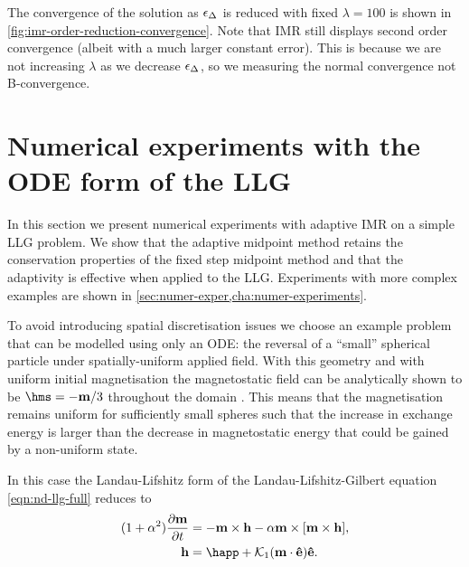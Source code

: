 The convergence of the solution as $\epsilon_{\Delta_{}}$ is reduced with fixed $\lambda = 100$ is shown in \cref{fig:imr-order-reduction-convergence}.
Note that IMR still displays second order convergence (albeit with a much larger constant error). 
This is because we are not increasing $\lambda$ as we decrease $\epsilon_{\Delta_{}}$, so we measuring the normal convergence not B-convergence.


\section{Numerical experiments with the ODE form of the LLG}
\label{sec:imr-ode-llg-numer-exper}

In this section we present numerical experiments with adaptive IMR on a simple LLG problem.
We show that the adaptive midpoint method retains the conservation properties of the fixed step midpoint method and that the adaptivity is effective when applied to the LLG.
Experiments with more complex examples are shown in \cref{sec:numer-exper,cha:numer-experiments}.

To avoid introducing spatial discretisation issues we choose an example problem that can be modelled using only an ODE: the reversal of a ``small'' spherical particle under spatially-uniform applied field.
With this geometry and with uniform initial magnetisation the magnetostatic field can be analytically shown to be $\hms = -\mv/3$ throughout the domain \cite[112]{Aharoni1996}.
This means that the magnetisation remains uniform for sufficiently small spheres such that the increase in exchange energy is larger than the decrease in magnetostatic energy that could be gained by a non-uniform state.

In this case the Landau-Lifshitz form of the Landau-Lifshitz-Gilbert equation \cref{eqn:nd-llg-full} reduces to
\begin{equation}
  \begin{aligned}
    (1 + \dampc^2) \dmdt &= - \mv \times \hv - \dampc \mv \times \bigs{\mv \times \hv}, \\
    \hv &= \happ + \kone (\mv \cdot \ev) \ev.
    \label{eqn:nd-ode-llg}
  \end{aligned}
\end{equation}

